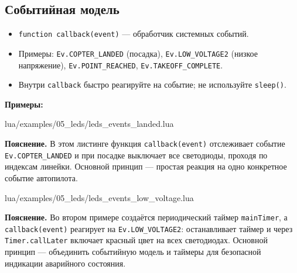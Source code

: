 \subsection{Событийная модель}
\begin{itemize}
  \item \verb|function callback(event)| — обработчик системных событий.
  \item Примеры: \verb|Ev.COPTER_LANDED| (посадка), \verb|Ev.LOW_VOLTAGE2| (низкое напряжение), \verb|Ev.POINT_REACHED|, \verb|Ev.TAKEOFF_COMPLETE|.
  \item Внутри \verb|callback| быстро реагируйте на событие; не используйте \verb|sleep()|.
\end{itemize}
\textbf{Примеры:}
\begin{codefile}{lua/examples/05_leds/leds_events_landed.lua}
\end{codefile}
\textbf{Пояснение.} В этом листинге функция \verb|callback(event)| отслеживает событие \verb|Ev.COPTER_LANDED| и при посадке выключает все светодиоды, проходя по индексам линейки. Основной принцип — простая реакция на одно конкретное событие автопилота.
\begin{codefile}{lua/examples/05_leds/leds_events_low_voltage.lua}
\end{codefile}
\textbf{Пояснение.} Во втором примере создаётся периодический таймер \verb|mainTimer|, а \verb|callback(event)| реагирует на \verb|Ev.LOW_VOLTAGE2|: останавливает таймер и через \verb|Timer.callLater| включает красный цвет на всех светодиодах. Основной принцип — объединить событийную модель и таймеры для безопасной индикации аварийного состояния.

